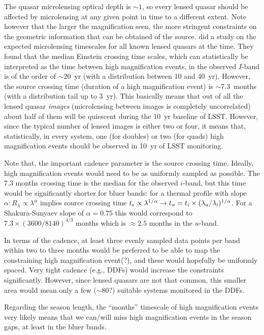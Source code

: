 The quasar microlensing optical depth is $\sim1$, so every lensed quasar should 
be affected by microlensing at any given point in time to a different extent. Note however that the larger the magnification seen, the more stringent constraints on the geometric information that can be obtained of the source. \citet{MosqueraandKochanek2011} did a study on the expected microlensing timescales for all known lensed quasars at the time. They found that the median Einstein crossing time scales, which can statistically be interpreted as the time between high magnification events, in 
the observed $I$-band is of the order of $\sim20$~yr (with a distribution 
between 10 and 40~yr). However, the source crossing time (duration of a high 
magnification event) is $\sim7.3$~months (with a distribution tail up to 3~yr). 
This basically means that out of all the lensed quasar {\em images} 
(microlensing between images is completely uncorrelated) about half of them will 
be quiescent during the 10~yr baseline of LSST. However, since the typical 
number of lensed images is either two or four, it means that, statistically, in 
every system, one (for doubles) or two (for quads) high magnification events 
should be observed in 10~yr of LSST monitoring. 


Note that, the important cadence parameter is the source crossing time. Ideally, high magnification events would need to be as uniformly sampled as
possible. The 7.3 months crossing time is the median for the observed
$i$-band, but this time would be significantly shorter for bluer bands:
for a thermal profile with slope
$\alpha: R_\lambda \propto \lambda^\alpha$ implies source crossing time
$t_{\rm s} \propto \lambda^{1/\alpha} \rightarrow
t_u=t_i \times (\lambda_{\rm u} / \lambda_{\rm i})^{1/\alpha}$. For a
Shakura-Sunyaev slope of $\alpha=0.75$ this would correspond to
$7.3 \times (3600/8140)^{4/3}$ months which is $\approx 2.5$ months in
the $u$-band.


In terms of the cadence, at least three evenly sampled data points per
band within two to three months would be preferred to be able to map
the constraining high magnification event(?), and these would
hopefully be uniformly spaced. Very tight cadence (e.g., DDFs) would
increase the constraints significantly. However, since lensed quasars
are not that common, this smaller area would mean only a few
($\sim80$?) suitable systems monitored in the DDFs.

Regarding the season length, the ``months'' timescale of high
magnification events very likely means that we can/will miss high
magnification events in the season gaps, at least in the bluer bands.

